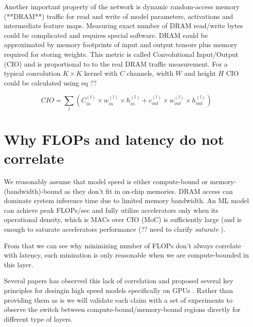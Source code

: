 Another important property of the network is dynamic random-access memory (**DRAM**) traffic for read and write of model parameters, activations and intermediate feature maps. Measuring exact number of DRAM read/write bytes could be complicated and requires special software. DRAM could be approximated by memory footprints of input and output tensors plus memory required for storing weights. This metric is called Convolutional Input/Output (CIO) \cite{chao2019_hardnet} and is proportional to to the real DRAM traffic measurement. For a typical convolution $K \times K$ kernel with $C$ channels, width $W$ and height $H$ CIO could be calculated using eq ??

$$
C I O=\sum_{l}\left(C_{in}^{(l)} \times w_{in}^{(l)} \times h_{in}^{(l)}+c_{o u t}^{(l)} \times w_{o u t}^{(l)} \times h_{o u t}^{(l)}\right)
$$



\section{Why FLOPs and latency do not correlate}

We reasonably assume that model speed is either compute-bound or memory-(bandwidth)-bound as they don't fit in on-chip memories. DRAM access can dominate system inference time due to limited memory bandwidth. An ML model can achieve peak FLOPs/sec and fully utilize accelerators only when its operational density, which is MACs over CIO (MoC) is sufficiently large (and is enough to saturate accelerators performance (?? need to clarify \textit{saturate} ). 


From that we can see why minimizing number of FLOPs don't always correlate with latency, such minization is only reasonable when we are compute-bounded in this layer. 

Several papers has observed this lack of correlation and proposed several key principles for desingin high speed models specifically on GPUs \cite{radosavovic2020_designing} \cite{lee2020_compounding_improvements}. Rather than providing them as is we will validate each claim with a set of experiments to observe the switch between compute-bound/memory-bound regions directly for different type of layers.

